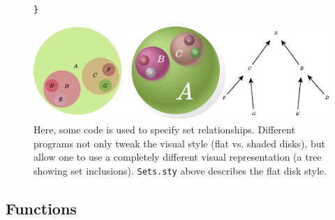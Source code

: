 \begin{figure}[ph]
\begin{minipage}[t]{\columnwidth}
\begin{mdframed}[style=STYCode]
\begin{lstlisting}[language=Sty-ST,escapechar=@,numbers=none]
}\end{lstlisting}\end{mdframed}\end{minipage}
\begin{minipage}[t]{\columnwidth}
\includegraphics[width=\columnwidth]{assets/penrose/set-styles.pdf}
\end{minipage}
   \caption{Here, some \Substance{} code is used to specify set relationships. Different \Style{} programs not only tweak the visual style (\eg flat vs. shaded disks), but allow one to use a completely different visual representation (\eg a tree showing set inclusions).  \texttt{Sets.sty} above describes the flat disk style.\label{fig:set-styles}}
\end{figure}


\subsection{Functions}
\label{sec:Functions}

